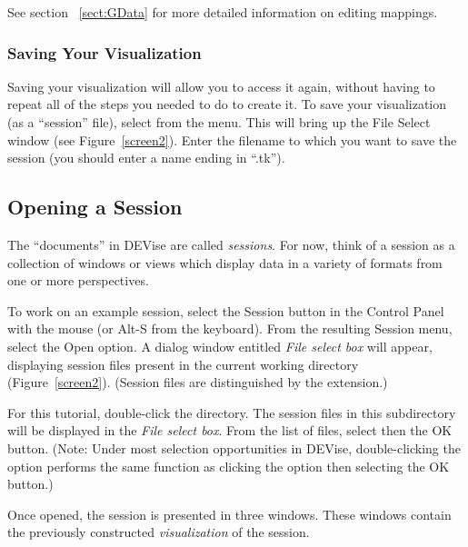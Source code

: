 See section ~\ref{sect:GData} for more detailed information on editing mappings.

\subsubsection{Saving Your Visualization}

Saving your visualization will allow you to access it again, without
having to repeat all of the steps you needed to do to create it.
To save your visualization (as a ``session'' file), select 
from the  menu.  This will bring up the File Select window
(see Figure~\ref{screen2}).  Enter the filename to which you want to save the
session (you should enter a name ending in ``.tk'').


\subsection{Opening a Session}

The ``documents'' in DEVise are called {\em sessions}. For now, think of a
session as a collection of windows or views which display data in a variety of
formats from one or more perspectives.

To work on an example session, select the Session button in the Control Panel
with the mouse (or Alt-S from the keyboard). From the resulting Session menu,
select the Open option. A dialog window entitled {\em File select box} will
appear, displaying session files present in the current working directory
(Figure~\ref{screen2}). (Session files are distinguished by the 
extension.)


For this tutorial, double-click the  directory. The session
files in this subdirectory will be displayed in the {\em File select box}. From
the list of files, select  then the OK button. (Note: Under
most selection opportunities in DEVise, double-clicking the option performs the
same function as clicking the option then selecting the OK button.)

Once opened, the  session is presented in three windows.
These windows contain the previously constructed {\em visualization} of the
session.


